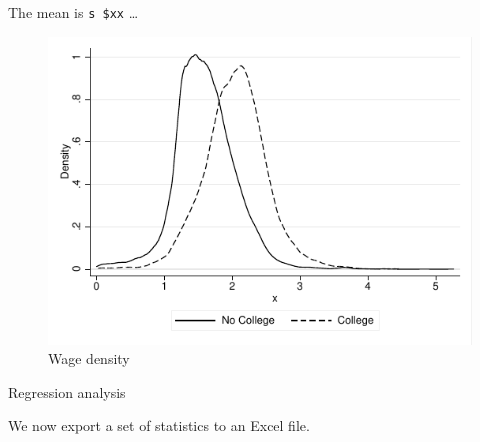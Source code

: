 \documentclass[
  12pt,
]{article}
\begin{document}
The mean is \texttt{s\ \$xx} \ldots{}

\begin{figure}
\centering
\includegraphics{logs/density.pdf}
\caption{Wage density}
\end{figure}

\begin{table}[ht]
\caption{Regression analysis}
\label{tab:stata}
  
\end{table}

We now export a set of statistics to an Excel file.
\end{document}
